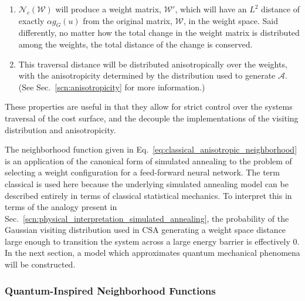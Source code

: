 \documentclass[10pt,journal,cspaper,compsoc]{IEEEtran}
\begin{document}
\begin{enumerate}
	\item $\mathcal{N}_{c} (\boldsymbol{\mathcal{W}})$ will produce a weight matrix, $\boldsymbol{\mathcal{W}'}$, which will have an $L^2$ distance of exactly $\alpha g_{G}(u)$ from the original matrix, $\boldsymbol{\mathcal{W}}$, in the weight space. Said differently, no matter how the total change in the weight matrix is distributed among the weights, the total distance of the change is conserved.
	\item This traversal distance will be distributed anisotropically over the weights, with the anisotropicity determined by the distribution used to generate $\boldsymbol{\mathcal{A}}$. (See Sec.~\ref{scn:anisotropicity} for more information.)
\end{enumerate}
These properties are useful in that they allow for strict control over the systems traversal of the cost surface, and the decouple the implementations of the visiting distribution and anisotropicity.

The neighborhood function given in Eq.~\ref{eq:classical_anisotropic_neighborhood} is an application of the canonical form of simulated annealing to the problem of selecting a weight configuration for a feed-forward neural network. The term classical is used here because the underlying simulated annealing model can be described entirely in terms of classical statistical mechanics. To interpret this in terms of the analogy present in Sec.~\ref{scn:physical_interpretation_simulated_annealing}, the probability of the Gaussian visiting distribution used in CSA generating a weight space distance large enough to transition the system across a large energy barrier is effectively $0$. In the next section, a model which approximates quantum mechanical phenomena will be constructed.

\subsubsection{Quantum-Inspired Neighborhood Functions}
\label{scn:quantum_neighborhood}
\end{document}

